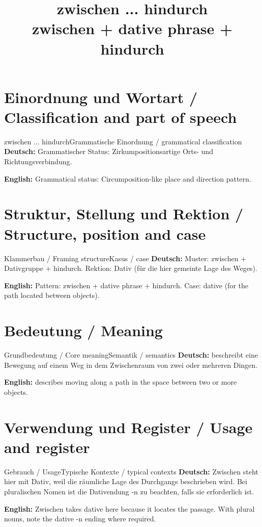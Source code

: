 \documentclass[a4paper,11pt]{article}
\title{zwischen ... hindurch\\ \large zwischen + dative phrase + hindurch}
\date{}
\newcommand{\GermanText}[1]{\textbf{Deutsch: }#1\par}
\newcommand{\EnglishText}[1]{{\small\color{SoftGray}\textbf{English: }#1\par}}
\begin{document}
\maketitle
\tableofcontents
\newpage
\section{Einordnung und Wortart / Classification and part of speech}
\begin{grammarentry}{zwischen ... hindurch}{Grammatische Einordnung / grammatical classification}
\GermanText{Grammatischer Status: Zirkumpositionsartige Orts- und Richtungsverbindung.}
\EnglishText{Grammatical status: Circumposition-like place and direction pattern.}
\end{grammarentry}
\section{Struktur, Stellung und Rektion / Structure, position and case}
\begin{grammarentry}{Klammerbau / Framing structure}{Kasus / case}
\GermanText{Muster: zwischen + Dativgruppe + hindurch. Rektion: Dativ (für die hier gemeinte Lage des Weges).}
\EnglishText{Pattern: zwischen + dative phrase + hindurch. Case: dative (for the path located between objects).}
\end{grammarentry}
\section{Bedeutung / Meaning}
\begin{grammarentry}{Grundbedeutung / Core meaning}{Semantik / semantics}
\GermanText{beschreibt eine Bewegung auf einem Weg in dem Zwischenraum von zwei oder mehreren Dingen.}
\EnglishText{describes moving along a path in the space between two or more objects.}
\end{grammarentry}
\section{Verwendung und Register / Usage and register}
\begin{grammarentry}{Gebrauch / Usage}{Typische Kontexte / typical contexts}
\GermanText{Zwischen steht hier mit Dativ, weil die räumliche Lage des Durchgangs beschrieben wird. Bei pluralischen Nomen ist die Dativendung -n zu beachten, falls sie erforderlich ist.}
\EnglishText{Zwischen takes dative here because it locates the passage. With plural nouns, note the dative -n ending where required.}
\end{grammarentry}
\end{document}
